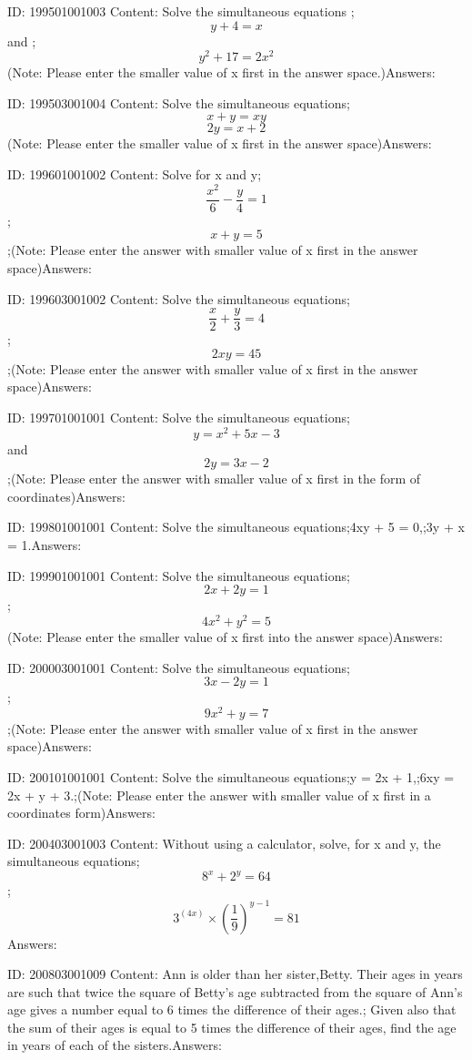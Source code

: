 \documentclass{article}
\begin{document}
ID: 199501001003
Content:
Solve the simultaneous equations ;\[y+4 = x\] and ;\[y^2+17 = 2x^{2}\] (Note: Please enter the smaller value of x first in the answer space.)Answers:

ID: 199503001004
Content:
Solve the simultaneous equations;\[x+y=xy\] \[2y=x+2\] (Note: Please enter the smaller value of x first in the answer space)Answers:

ID: 199601001002
Content:
Solve for x and y; \[\frac{x^{2}}{6}-\frac{y}{4}=1\] ; \[x+y=5\];(Note: Please enter the answer with smaller value of x first in the answer space)Answers:

ID: 199603001002
Content:
Solve the simultaneous equations; \[\frac{x}{2}+\frac{y}{3}=4\]; \[2xy=45\];(Note: Please enter the answer with smaller value of x first in the answer space)Answers:

ID: 199701001001
Content:
Solve the simultaneous equations;\[y=x^2+5x-3\] and \[2y=3x-2\];(Note: Please enter the answer with smaller value of x first in the form of coordinates)Answers:

ID: 199801001001
Content:
Solve the simultaneous equations;4xy + 5 = 0,;3y + x = 1.Answers:

ID: 199901001001
Content:
Solve the simultaneous equations; \[2x+2y=1\];\[4x^2+y^2=5\](Note: Please enter the smaller value of x first into the answer space)Answers:

ID: 200003001001
Content:
Solve the simultaneous equations;$$3x-2y=1$$;$$9x^2+y=7$$;(Note: Please enter the answer with smaller value of x first in the answer space)Answers:

ID: 200101001001
Content:
Solve the simultaneous equations;y = 2x + 1,;6xy = 2x + y + 3.;(Note: Please enter the answer with smaller value of x first in a coordinates form)Answers:

ID: 200403001003
Content:
Without using a calculator, solve, for x and y, the simultaneous equations;$$8^x + 2^y=64$$;$$3^{(4x)} \times (\frac{1}{9})^{y-1} = 81$$Answers:

ID: 200803001009
Content:
Ann is older than her sister,Betty. Their ages in years are such that twice the square of Betty's age subtracted from the square of Ann's age gives a number equal to 6 times the difference of their ages.; Given also that the sum of their ages is equal to 5 times the difference of their ages, find the age in years of each of the sisters.Answers:
\end{document}
